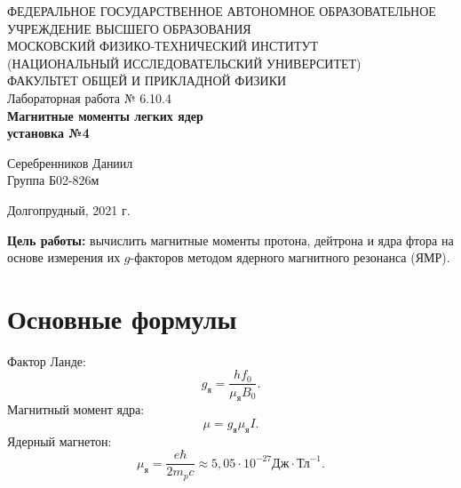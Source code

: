\documentclass[a4paper,12pt]{article} %
\begin{document}
	\begin{center}
		\footnotesize{ФЕДЕРАЛЬНОЕ ГОСУДАРСТВЕННОЕ АВТОНОМНОЕ ОБРАЗОВАТЕЛЬНОЕ 			УЧРЕЖДЕНИЕ ВЫСШЕГО ОБРАЗОВАНИЯ}\\
		\footnotesize{МОСКОВСКИЙ ФИЗИКО-ТЕХНИЧЕСКИЙ ИНСТИТУТ\\(НАЦИОНАЛЬНЫЙ 			ИССЛЕДОВАТЕЛЬСКИЙ УНИВЕРСИТЕТ)}\\
		\footnotesize{ФАКУЛЬТЕТ ОБЩЕЙ И ПРИКЛАДНОЙ ФИЗИКИ\\}
		\hfill \break
		\hfill\break
		\hfill\break
		\hfill \break
		\hfill \break
		\hfill \break
		\hfill \break
		\hfill \break
		\hfill \break
		\hfill \break
		\hfill \break
		\hfill \break
		\hfill \break
		\hfill \break
		\large{Лабораторная работа № 6.10.4 \\\textbf{Магнитные моменты легких ядер\\установка №4}}\\
		\hfill \break
		\hfill \break
		\hfill \break
		\begin{flushright}
			Серебренников Даниил\\
			Группа Б02-826м
		\end{flushright}
		\hfill \break
		\hfill \break
		\hfill \break
		\hfill \break
		\hfill \break
		\hfill \break
		\hfill \break
		\hfill \break
		\hfill \break
		\hfill \break
		\hfill \break
	\end{center}
	\begin{center}
		Долгопрудный, 2021 г.
	\end{center}
	\thispagestyle{empty}
	\newpage
	\textbf{Цель работы:} вычислить магнитные моменты протона, дейтрона и ядра фтора на основе измерения их $g$-факторов методом ядерного магнитного резонанса (ЯМР).
	
	\section{Основные формулы}
	Фактор Ланде:
	\begin{equation*}
		\label{eq:g}
		\tag{$\star$}
		g_\text{я} = \frac{hf_0}{\mu_\text{я}B_0}.
	\end{equation*}
	Магнитный момент ядра:
	\begin{equation*}
		\label{eq:mu}
		\tag{$\star\star$}
		\mu = g_\text{я}\mu_\text{я}I.
	\end{equation*}
	Ядерный магнетон:
	\begin{equation*}
		\mu_{\text{я}} = \frac{e\hbar}{2m_pc} \approx 5,05\cdot10^{-27} \text{Дж}\cdot\text{Тл}^{-1}.
	\end{equation*}
\end{document}
